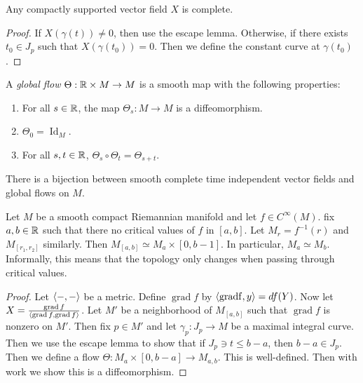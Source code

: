 \documentclass[twoside, 10pt]{article}
\begin{document}
    \begin{prop}
        Any compactly supported vector field $X$ is complete.
    \end{prop}

    \begin{proof}
        If $X(\gamma(t)) \neq 0$, then use the escape lemma. Otherwise, if there exists $t_0 \in J_p$ such that $X(\gamma(t_0)) = 0$. Then we define the constant curve at $\gamma(t_0)$.
    \end{proof}

    \begin{defn}
        A \textit{global flow} $\Theta:\mathbb{R} \times M \to M$ is a smooth map with the following properties:
        \begin{enumerate}
            \item For all $s \in \mathbb{R}$, the map $\Theta_s:M \to M$ is a diffeomorphism.
            \item $\Theta_0 = \operatorname{Id}_M$.
            \item For all $s, t \in \mathbb{R}$, $\Theta_s \circ \Theta_t = \Theta_{s+t}$.
        \end{enumerate}
    \end{defn}

    \begin{thm}
        There is a bijection between smooth complete time independent vector fields and global flows on $M$.
    \end{thm}

    \begin{exm}
        Let $M$ be a smooth compact Riemannian manifold and let $f \in C^{\infty}(M)$. fix $a,b \in \mathbb{R}$ such that there no critical values of $f$ in $[a,b]$. Let $M_r = f^{-1}(r)$ and $M_{[r_1, r_2]}$ similarly. Then $M_{[a,b]} \simeq M_a \times [0, b-1]$. In particular, $M_a \simeq M_b$. Informally, this means that the topology only changes when passing through critical values.
    \end{exm}

    \begin{proof}
        Let $\langle-,-\rangle$ be a metric. Define $\operatorname{grad} f$ by $\langle\operatorname{grad f}, y\rangle = df(Y)$. Now let $X = \frac{\operatorname{grad} f}{\langle\operatorname{grad} f, \operatorname{grad} f\rangle}$. Let $M'$ be a neighborhood of $M_{[a,b]}$ such that $\operatorname{grad} f$ is nonzero on $M'$. Then fix $p \in M'$ and let $\gamma_p: J_p \to M$ be a maximal integral curve. Then we use the escape lemma to show that if $J_p \ni t \leq b-a$, then $b-a \in J_p$. Then we define a flow $\Theta:M_a \times [0, b-a] \to M_{a,b}$. This is well-defined. Then with work we show this is a diffeomorphism.
    \end{proof}
\end{document}
